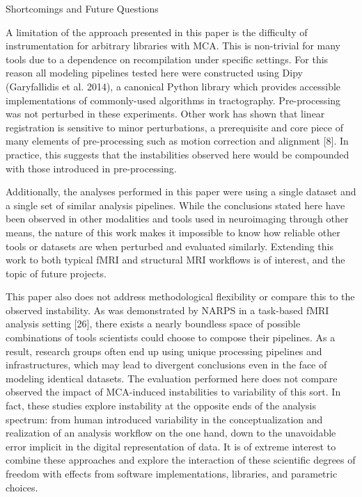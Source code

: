 \documentclass[fleqn,10pt]{SelfArx} %
\begin{document}
Shortcomings and Future Questions

A limitation of the approach presented in this paper is the difficulty of instrumentation for arbitrary libraries with MCA. This is non-trivial for many tools due to a dependence on recompilation under specific settings. For this reason all modeling pipelines tested here were constructed using Dipy (Garyfallidis et al. 2014), a canonical Python library which provides accessible implementations of commonly-used algorithms in tractography. Pre-processing was not perturbed in these experiments. Other work has shown that linear registration is sensitive to minor perturbations, a prerequisite and core piece of many elements of pre-processing such as motion correction and alignment [8]. In practice, this suggests that the instabilities observed here would be compounded with those introduced in pre-processing.

Additionally, the analyses performed in this paper were using a single dataset and a single set of similar analysis pipelines. While the conclusions stated here have been observed in other modalities and tools used in neuroimaging through other means, the nature of this work makes it impossible to know how reliable other tools or datasets are when perturbed and evaluated similarly. Extending this work to both typical fMRI and structural MRI workflows is of interest, and the topic of future projects.

This paper also does not address methodological flexibility or compare this to the observed instability. As was demonstrated by NARPS in a task-based fMRI analysis setting [26], there exists a nearly boundless space of possible combinations of tools scientists could choose to compose their pipelines. As a result, research groups often end up using unique processing pipelines and infrastructures, which may lead to divergent conclusions even in the face of modeling identical datasets. The evaluation performed here does not compare observed the impact of MCA-induced instabilities to variability of this sort. In fact, these studies explore instability at the opposite ends of the analysis spectrum: from human introduced variability in the conceptualization and realization of an analysis workflow on the one hand, down to the unavoidable error implicit in the digital representation of data. It is of extreme interest to combine these approaches and explore the interaction of these scientific degrees of freedom with effects from software implementations, libraries, and parametric choices.
\end{document}
